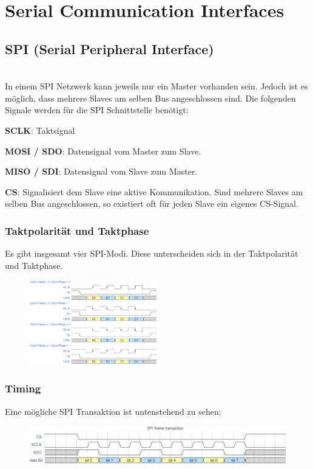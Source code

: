 \section{Serial Communication Interfaces}
\subsection{SPI (Serial Peripheral Interface)}$~$ \\
In einem SPI Netzwerk kann jeweils nur ein Master vorhanden sein. Jedoch ist es möglich, dass mehrere Slaves am selben Bus angeschlossen sind. Die folgenden Signale werden für die SPI Schnittstelle benötigt:
\begin{compactitem}
    \item \textbf{SCLK}: Taktsignal
    \item \textbf{MOSI / SDO}: Datensignal vom Master zum Slave.
    \item \textbf{MISO / SDI}: Datensignal vom Slave zum Master.
    \item \textbf{CS}: Signalisiert dem Slave eine aktive Kommunikation. Sind mehrere Slaves am selben Bus angeschlossen, so existiert oft für jeden Slave ein eigenes CS-Signal.
\end{compactitem}

\subsubsection{Taktpolarität und Taktphase}
Es gibt insgesamt vier SPI-Modi. Diese unterscheiden sich in der Taktpolarität und Taktphase.
\begin{figure}[H]
    \includegraphics[width=0.5\textwidth]{images/spi_taktphase.png}
\end{figure}

\subsubsection{Timing}
Eine mögliche SPI Transaktion ist untenstehend zu sehen:
\begin{figure}[H]
    \includegraphics[width=1\textwidth]{images/spi_timing.png}
\end{figure}

